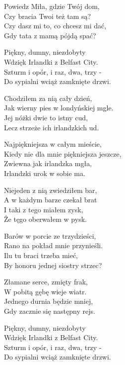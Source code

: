 \begin{text}
    Powiedz Miła, gdzie Twój dom,\\
    Czy bracia Twoi też tam są?\\
    Czy dasz mi to, co chcesz mi dać,\\
    Gdy tata z mamą pójdą spać?

    Piękny, dumny, niezdobyty\\
    Wdzięk Irlandki z Belfast City.\\
    Szturm i opór, i raz, dwa, trzy -\\
    Do sypialni wciąż zamknięte drzwi.

    Chodziłem za nią cały dzień,\\
    Jak wierny pies w londyńskiej mgle.\\
    Jej nóżki dwie to istny cud,\\
    Lecz strzeże ich irlandzkich ud.

    Najpiękniejsza w całym mieście,\\
    Kiedy nie dla mnie piękniejsza jeszcze,\\
    Zwiewna jak irlandzka mgła,\\
    Irlandzki urok w sobie ma.

    Niejeden z nią zwiedziłem bar,\\
    A w każdym barze czekał brat\\
    I taki z tego miałem zysk,\\
    Że tęgo oberwałem w pysk.

    Barów w porcie ze trzydzieści,\\
    Rano na pokład mnie przynieśli.\\
    Ilu tu braci trzeba mieć,\\
    By honoru jednej siostry strzec?

    Złamane serce, zmięty frak,\\
    W pobitą gębę wieje wiatr.\\
    Jednego durnia będzie mniej,\\
    Gdy zacznie się następny rejs.

    Piękny, dumny, niezdobyty\\
    Wdzięk Irlandki z Belfast City.\\
    Szturm i opór, i raz, dwa, trzy -\\
    Do sypialni wciąż zamknięte drzwi.
\end{text}
\begin{chord}

\end{chord}